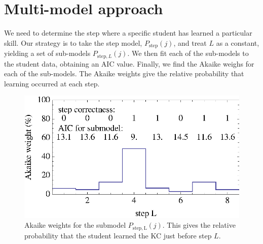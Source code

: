 \documentclass[prodmode,acmtecs]{acmsmall}
\begin{document}
\section{Multi-model approach}
\label{multi-model}

We need to determine the step where a specific student has learned a
particular skill.  Our strategy is to take the step model, 
$P_\mathrm{step}(j)$, and treat $L$ as a constant, yielding a set of 
sub-models $P_{\mathrm{step},L}(j)$.
We then fit each of the sub-models to the student data, obtaining an
AIC value.  Finally, we find the Akaike weighs for each of the
sub-models.  The Akaike weights give the relative probability that learning
occurred at each step.

\begin{figure}
  \centering \includegraphics{step-weights.eps}
   \caption{Akaike weights for the submodel $P_\mathrm{step,L}(j)$.  
     This gives the relative probability that
      the student learned the KC just before step $L$.}
    \label{step-weights}
\end{figure}
\end{document}
